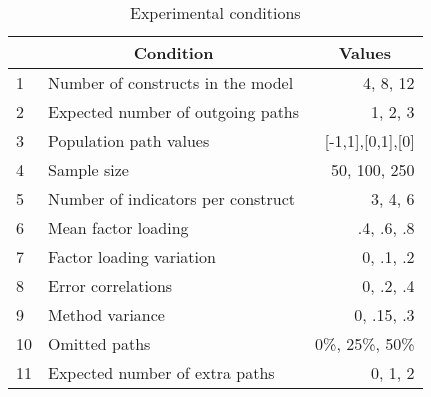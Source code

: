 \documentclass[10pt]{report}
\begin{document}
%


\begin{table}[ht]
\begin{center}
\caption{Experimental conditions}
\begin{tabular}{llr}
\toprule
&\multicolumn{1}{c}{Condition}&\multicolumn{1}{c}{Values} \\
\midrule
1&Number of constructs in the model&4, 8, 12\\ 
2&Expected number of outgoing paths&1, 2, 3\\ 
3&Population path values&[-1,1],[0,1],[0]\\ 
\midrule
4&Sample size&50, 100, 250\\ 
\midrule
5&Number of indicators per construct &3, 4, 6\\ 
6&Mean factor loading&.4, .6, .8\\ 
7&Factor loading variation&0, .1, .2\\ 
8&Error correlations&0, .2, .4\\ 
9&Method variance&0, .15, .3\\ 
\midrule
10&Omitted paths&0\%, 25\%, 50\%\\ 
11&Expected number of extra paths&0, 1, 2\\
\bottomrule
\end{tabular}
\end{center}
\end{table}
\end{document}
